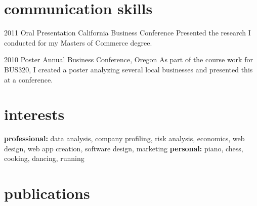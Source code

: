 \documentclass[a4paper,nocolors]{cv-friggeri-x}
\begin{document}

\section{communication skills}

\begin{entrylist}


\entry
{2011}
{Oral Presentation}
{California Business Conference}
{Presented the research I conducted for my Masters of Commerce degree.}


\entry
{2010}
{Poster}
{Annual Business Conference, Oregon}
{As part of the course work for BUS320, I created a poster analyzing several local businesses and presented this at a conference.}


\end{entrylist}


\section{interests}

\textbf{professional:} data analysis, company profiling, risk analysis, economics, web design, web app creation, software design, marketing \textbf{personal:} piano, chess, cooking, dancing, running


\section{publications}

\end{document}
